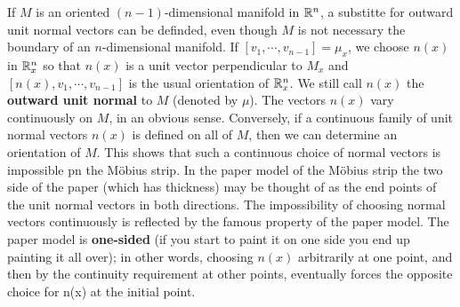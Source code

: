 If $M$ is an oriented $(n-1)$-dimensional manifold in $\mathbb{R}^n$, a substitte for outward unit normal 
vectors can be definded, even though $M$ is not necessary the boundary of an $n$-dimensional manifold.
If $[v_1,\cdots,v_{n-1}]=\mu_x$, we choose $n(x)$ in $\mathbb{R}^n_x$ so that $n(x)$ is a unit vector perpendicular 
to $M_x$ and $[n(x), v_1,\cdots,v_{n-1}]$ is the usual orientation of $\mathbb{R}^n_x$. We still call $n(x)$ 
the \textbf{outward unit normal} to $M$ (denoted by $\mu$). The vectors $n(x)$ vary continuously on $M$, in an 
obvious sense. Conversely, if a continuous family of unit normal vectors $n(x)$ is defined on all of $M$, 
then we can determine an orientation of $M$. This shows that such a continuous choice of normal vectors is 
impossible pn the M\"obius strip. In the paper model of the M\"obius strip the two side of the paper (which 
has thickness) may be thought of as the end points of the unit normal vectors in both directions.
The impossibility of choosing normal vectors continuously is reflected by the
famous property of the paper model. The paper model is \textbf{one-sided} (if you start to paint it on one 
side you end up painting it all over); in other words, choosing $n(x)$ arbitrarily
at one point, and then by the continuity requirement at other points, eventually forces the 
opposite choice for n(x) at the initial point.


